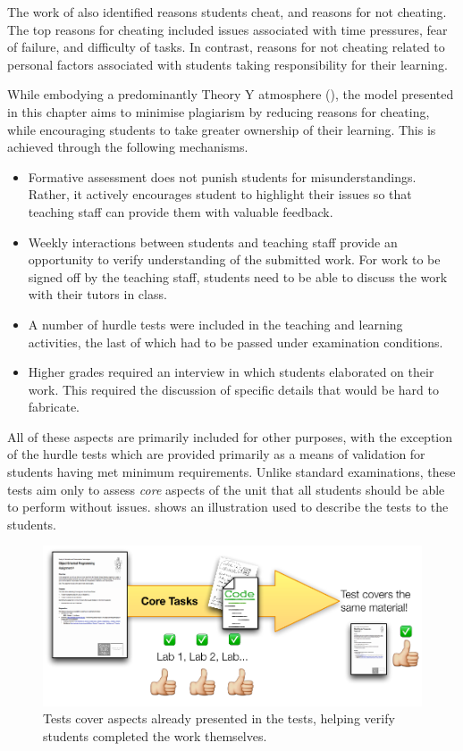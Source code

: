 The work of \citet{Sheard:2003} also identified reasons students cheat, and reasons for not cheating. The top reasons for cheating included issues associated with time pressures, fear of failure, and difficulty of tasks. In contrast, reasons for not cheating related to personal factors associated with students taking responsibility for their learning.

While embodying a predominantly Theory Y atmosphere (), the model presented in this chapter aims to minimise plagiarism by reducing reasons for cheating, while encouraging students to take greater ownership of their learning. This is achieved through the following mechanisms.
\begin{itemize}[noitemsep,nolistsep]
	\item Formative assessment does not punish students for misunderstandings. Rather, it actively encourages student to highlight their issues so that teaching staff can provide them with valuable feedback. 
	\item Weekly interactions between students and teaching staff provide an opportunity to verify understanding of the submitted work. For work to be signed off by the teaching staff, students need to be able to discuss the work with their tutors in class.
	\item A number of hurdle tests were included in the teaching and learning activities, the last of which had to be passed under examination conditions.
	\item Higher grades required an interview in which students elaborated on their work. This required the discussion of specific details that would be hard to fabricate.
\end{itemize}

All of these aspects are primarily included for other purposes, with the exception of the hurdle tests which are provided primarily as a means of validation for students having met minimum requirements. Unlike standard examinations, these tests aim only to assess \emph{core} aspects of the unit that all students should be able to perform without issues.  shows an illustration used to describe the tests to the students.

\begin{figure}[htbp]
	\centering
	\includegraphics[width=\textwidth]{Tests}
	\caption{Tests cover aspects already presented in the tests, helping verify students completed the work themselves.}
	\label{fig:tests}
\end{figure}

